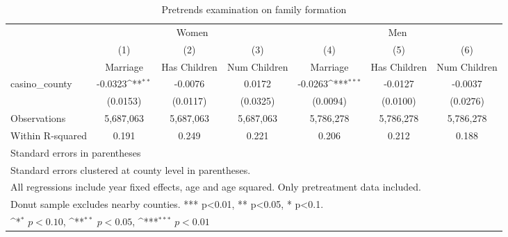 \begin{table}[htbp]\centering
\def\sym#1{\ifmmode^{#1}\else\(^{#1}\)\fi}
\caption{Pretrends examination on family formation}
\begin{tabular}{l*{6}{c}}
\hline\hline
            &\multicolumn{3}{c}{Women}                                        &\multicolumn{3}{c}{Men}                                          \\\cmidrule(lr){2-4}\cmidrule(lr){5-7}
            &\multicolumn{1}{c}{(1)}&\multicolumn{1}{c}{(2)}&\multicolumn{1}{c}{(3)}&\multicolumn{1}{c}{(4)}&\multicolumn{1}{c}{(5)}&\multicolumn{1}{c}{(6)}\\
            &\multicolumn{1}{c}{Marriage}&\multicolumn{1}{c}{Has Children}&\multicolumn{1}{c}{Num Children}&\multicolumn{1}{c}{Marriage}&\multicolumn{1}{c}{Has Children}&\multicolumn{1}{c}{Num Children}\\
\hline
casino\_county&     -0.0323\sym{**} &     -0.0076         &      0.0172         &     -0.0263\sym{***}&     -0.0127         &     -0.0037         \\
            &    (0.0153)         &    (0.0117)         &    (0.0325)         &    (0.0094)         &    (0.0100)         &    (0.0276)         \\
\hline
Observations&   5,687,063         &   5,687,063         &   5,687,063         &   5,786,278         &   5,786,278         &   5,786,278         \\
Within R-squared&       0.191         &       0.249         &       0.221         &       0.206         &       0.212         &       0.188         \\
\hline\hline
\multicolumn{7}{l}{\footnotesize Standard errors in parentheses}\\
\multicolumn{7}{l}{\footnotesize Standard errors clustered at county level in parentheses.}\\
\multicolumn{7}{l}{\footnotesize All regressions include year fixed effects, age and age squared. Only pretreatment data included.}\\
\multicolumn{7}{l}{\footnotesize Donut sample excludes nearby counties. *** p<0.01, ** p<0.05, * p<0.1.}\\
\multicolumn{7}{l}{\footnotesize \sym{*} \(p<0.10\), \sym{**} \(p<0.05\), \sym{***} \(p<0.01\)}\\
\end{tabular}
\end{table}
